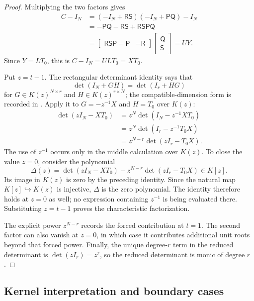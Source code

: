 \documentclass[11pt,letterpaper]{article}
\theoremstyle{plain}
\begin{document}
\begin{proof}
Multiplying the two factors gives
\begin{align*}
C-I_N
&=(-I_N+\mathsf R\mathsf S)(-I_N+\mathsf P\mathsf Q)-I_N\\
&=-\mathsf P\mathsf Q-\mathsf R\mathsf S
  +\mathsf R\mathsf S\mathsf P\mathsf Q\\
&=\begin{bmatrix}\mathsf R\mathsf S\mathsf P-\mathsf P&-\mathsf R\end{bmatrix}
  \begin{bmatrix}\mathsf Q\\ \mathsf S\end{bmatrix}=UY.
\end{align*}
Since $Y=LT_0$, this is $C-I_N=UL T_0=XT_0$.

Put $z=t-1$.  The rectangular determinant identity says that
\[
\det(I_N+GH)=\det(I_r+HG)
\]
for $G\in K(z)^{N\times r}$ and $H\in K(z)^{r\times N}$; the compatible-dimension form is recorded in \cite[Appendix A.12, p.~651]{StdKailath1980LinearSystems}.  Apply it to $G=-z^{-1}X$ and $H=T_0$ over $K(z)$:
\begin{align*}
\det(zI_N-XT_0)
&=z^N\det(I_N-z^{-1}XT_0)\\
&=z^N\det(I_r-z^{-1}T_0X)\\
&=z^{N-r}\det(zI_r-T_0X).
\end{align*}
The use of $z^{-1}$ occurs only in the middle calculation over $K(z)$.  To close the value $z=0$, consider the polynomial
\[
\Delta(z)=
\det(zI_N-XT_0)
-z^{N-r}\det(zI_r-T_0X)\in K[z].
\]
Its image in $K(z)$ is zero by the preceding identity.  Since the natural map $K[z]\hookrightarrow K(z)$ is injective, $\Delta$ is the zero polynomial.  The identity therefore holds at $z=0$ as well; no expression containing $z^{-1}$ is being evaluated there.  Substituting $z=t-1$ proves the characteristic factorization.

The explicit power $z^{N-r}$ records the forced contribution at $t=1$.  The second factor can also vanish at $z=0$, in which case it contributes additional unit roots beyond that forced power.  Finally, the unique degree-$r$ term in the reduced determinant is $\det(zI_r)=z^r$, so the reduced determinant is monic of degree $r$.
\end{proof}

\subsection{Kernel interpretation and boundary cases}
\end{document}
